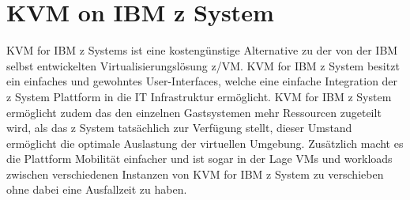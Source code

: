 \documentclass[14pt]{extreport}
\begin{document}
\newpage
\section{KVM on IBM z System}
KVM for IBM z Systems ist eine kostengünstige Alternative zu der von der IBM selbst entwickelten Virtualisierungslösung z/VM. KVM for IBM z System besitzt ein einfaches und gewohntes User-Interfaces, welche eine einfache Integration der z System Plattform in die IT Infrastruktur ermöglicht.
KVM for IBM z System ermöglicht zudem das den einzelnen Gastsystemen mehr Ressourcen zugeteilt wird, als das z System tatsächlich zur Verfügung stellt, dieser Umstand ermöglicht die optimale Auslastung der virtuellen Umgebung. Zusätzlich macht es die Plattform Mobilität einfacher und ist sogar in der Lage VMs und workloads zwischen verschiedenen Instanzen von KVM for IBM z System zu verschieben ohne dabei eine Ausfallzeit zu haben. \cite{website:ibm2}
\end{document}
